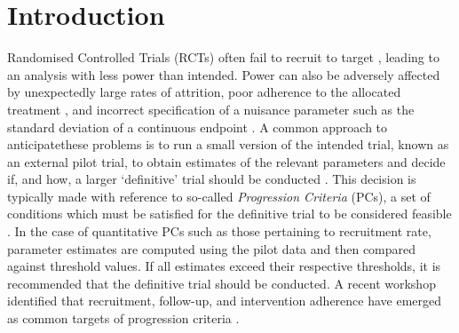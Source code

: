 \documentclass[AMA,STIX1COL]{WileyNJD-v2}
\begin{document}

\maketitle

\section{Introduction}\label{sec:intro}

Randomised Controlled Trials (RCTs) often fail to recruit to target \cite{Sully2013}, leading to an analysis with less power than intended. Power can also be adversely affected by unexpectedly large rates of attrition, poor adherence to the allocated treatment \cite{Fay2006}, and incorrect specification of a nuisance parameter such as the standard deviation of a continuous endpoint \cite{Teare2014}. A common approach to anticipatethese problems is to run a small version of the intended trial, known as an external pilot trial, to obtain estimates of the relevant parameters and decide if, and how, a larger `definitive' trial should be conducted  \cite{Eldridge2016}. This decision is typically made with reference to so-called \emph{Progression Criteria} (PCs), a set of conditions which must be satisfied for the definitive trial to be considered feasible \cite{Avery2017}. In the case of quantitative PCs such as those pertaining to recruitment rate, parameter estimates are computed using the pilot data and then compared against threshold values. If all estimates exceed their respective thresholds, it is recommended that the definitive trial should be conducted. A recent workshop identified that recruitment, follow-up, and intervention adherence have emerged as common targets of progression criteria \cite{Avery2017}. 
\end{document}

